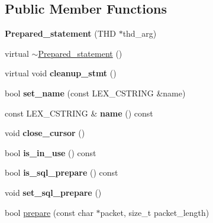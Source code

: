 \subsection*{Public Member Functions}
\begin{DoxyCompactItemize}
\item 
\mbox{\label{classPrepared__statement_a0495f17b9ef472b7cc36688ab821a56b}} 
{\bfseries Prepared\+\_\+statement} (T\+HD $\ast$thd\+\_\+arg)
\item 
virtual \mbox{\hyperlink{classPrepared__statement_a3fd21faacd303bbc3c64a81d08755ab5}{$\sim$\+Prepared\+\_\+statement}} ()
\item 
\mbox{\label{classPrepared__statement_a4e56ad949bfe4417431c49b1876adce2}} 
virtual void {\bfseries cleanup\+\_\+stmt} ()
\item 
\mbox{\label{classPrepared__statement_ad8c415a7134b32988b7c7ebd2bbf2c03}} 
bool {\bfseries set\+\_\+name} (const L\+E\+X\+\_\+\+C\+S\+T\+R\+I\+NG \&name)
\item 
\mbox{\label{classPrepared__statement_a86d5de565ece19b2a507c0a16e0f28a8}} 
const L\+E\+X\+\_\+\+C\+S\+T\+R\+I\+NG \& {\bfseries name} () const
\item 
\mbox{\label{classPrepared__statement_a9faaf44f12ac63713c64a88bbe789caa}} 
void {\bfseries close\+\_\+cursor} ()
\item 
\mbox{\label{classPrepared__statement_af910b63ece98dcfe8c6ac6be563f335e}} 
bool {\bfseries is\+\_\+in\+\_\+use} () const
\item 
\mbox{\label{classPrepared__statement_a673ddcabc58287c78b9481f65268eee7}} 
bool {\bfseries is\+\_\+sql\+\_\+prepare} () const
\item 
\mbox{\label{classPrepared__statement_a1d1fdab484ea863264c0c68433991ddb}} 
void {\bfseries set\+\_\+sql\+\_\+prepare} ()
\item 
bool \mbox{\hyperlink{classPrepared__statement_a7f79adbd42eb5d502f5d248d17de5b3c}{prepare}} (const char $\ast$packet, size\+\_\+t packet\+\_\+length)

\end{DoxyCompactItemize}
